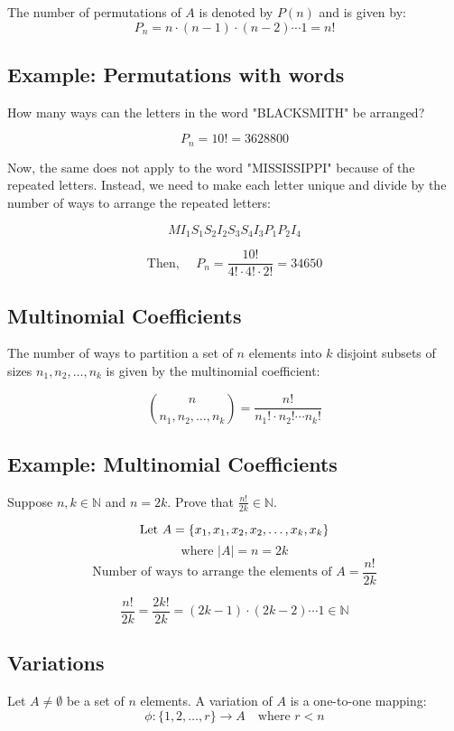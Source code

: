 \documentclass[11pt]{article}
\begin{document}
The number of permutations of $A$ is denoted by $P(n)$ and is given by:
\[  
P_n = n \cdot ( n - 1 ) \cdot (n - 2) \cdots 1 = n!
\]

\subsection*{Example: Permutations with words}
How many ways can the letters in the word "BLACKSMITH" be arranged?

\[
P_n = 10! = 3628800
\]

Now, the same does not apply to the word "MISSISSIPPI" because of the repeated letters.
Instead, we need to make each letter unique and divide by the number of ways to arrange the repeated letters:

\[
MI_1S_1S_2I_2S_3S_4I_3P_1P_2I_4
\]

\[
\text{Then, } \quad P_n = \frac{10!}{4! \cdot 4! \cdot 2!} = 34650
\]

\subsection{Multinomial Coefficients}
The number of ways to partition a set of $n$ elements into $k$ disjoint subsets of sizes $n_1, n_2, \dots, n_k$ is given by the multinomial coefficient:

\[
\binom{n}{n_1, n_2, \dots, n_k} = \frac{n!}{n_1! \cdot n_2! \cdots n_k!}
\]

\subsection*{Example: Multinomial Coefficients}
Suppose $n, k \in \mathbb{N}$ and $n = 2k$. Prove that $\frac{n!}{2k} \in \mathbb{N}$.

\[
\text{Let } A = \{x_1, x_1, x_2, x_2, \dots, x_k, x_k\} \\
\]
\[
\text{where } |A| = n = 2k 
\]
\[
\text{Number of ways to arrange the elements of } A = \frac{n!}{2k}
\]

\[
\frac{n!}{2k} = \frac{2k!}{2k} = (2k - 1) \cdot (2k - 2) \cdots 1 \in \mathbb{N}
\]

\subsection{Variations}
Let $A \neq \emptyset$ be a set of $n$ elements. A variation of $A$ is a one-to-one mapping:
\[
\phi: \{1,2,\dots ,r\} \rightarrow A \quad \text{where } r < n
\]
\end{document}
